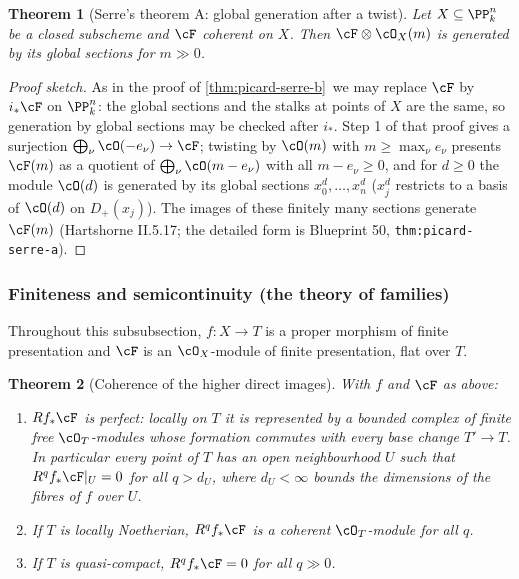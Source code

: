 \documentclass[11pt]{article}
\theoremstyle{plain}
\newtheorem{theorem}{Theorem}[section]
\theoremstyle{definition}
\newcommand{\Cref}[1]{\hyperref[#1]{\ref{#1}}\,\hyperref[#1]{\nameref*{#1}}}
\begin{document}
\begin{theorem}[Serre's theorem A: global generation after a twist]
\label{thm:picard-serre-a}
Let $X\subseteq\PP^n_k$ be a closed subscheme and $\cF$ coherent on
$X$.  Then $\cF\otimes\cO_X(m)$ is generated by its global
sections for $m\gg0$.
\end{theorem}

\begin{proof}[Proof sketch]
As in the proof of \Cref{thm:picard-serre-b} we may replace $\cF$ by
$i_*\cF$ on $\PP^n_k$: the global sections and the stalks at points of
$X$ are the same, so generation by global sections may be checked after
$i_*$.  Step 1 of that proof gives a surjection
$\bigoplus_\nu\cO(-e_\nu)\to\cF$; twisting by $\cO(m)$ with
$m\ge\max_\nu e_\nu$ presents $\cF(m)$ as a quotient of
$\bigoplus_\nu\cO(m-e_\nu)$ with all $m-e_\nu\ge0$, and for $d\ge0$ the
module $\cO(d)$ is generated by its global sections $x_0^d,\dots,x_n^d$
($x_j^d$ restricts to a basis of $\cO(d)$ on $D_+(x_j)$).  The images of
these finitely many sections generate $\cF(m)$ (Hartshorne II.5.17; the
detailed form is Blueprint 50, \texttt{thm:picard-serre-a}).
\end{proof}

\subsubsection{Finiteness and semicontinuity (the theory of families)}

Throughout this subsubsection, $f:X\to T$ is a proper morphism of
finite presentation and $\cF$ is an $\cO_X$-module of finite
presentation, flat over $T$.

\begin{theorem}[Coherence of the higher direct images]
\label{thm:picard-coherence}
With $f$ and $\cF$ as above:
\begin{enumerate}
\item[(a)] $Rf_*\cF$ is perfect: locally on $T$ it is represented by a
bounded complex of finite free $\cO_T$-modules whose formation commutes
with every base change $T'\to T$.  In particular every point of $T$ has
an open neighbourhood $U$ such that $R^qf_*\cF|_U=0$ for all $q>d_U$,
where $d_U<\infty$ bounds the dimensions of the fibres of $f$ over $U$.
\item[(b)] If $T$ is locally Noetherian, $R^qf_*\cF$ is a coherent
$\cO_T$-module for all $q$.
\item[(c)] If $T$ is quasi-compact, $R^qf_*\cF=0$ for all $q\gg0$.
\end{enumerate}
\end{theorem}
\end{document}
